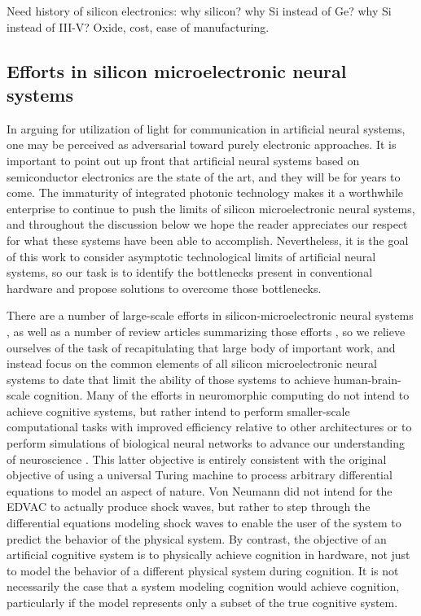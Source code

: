 \documentclass[twocolumn]{article}
\begin{document}
Need history of silicon electronics: why silicon? why Si instead of Ge? why Si instead of III-V? Oxide, cost, ease of manufacturing.

\subsection{Efforts in silicon microelectronic neural systems}
In arguing for utilization of light for communication in artificial neural systems, one may be perceived as adversarial toward purely electronic approaches. It is important to point out up front that artificial neural systems based on semiconductor electronics are the state of the art, and they will be for years to come. The immaturity of integrated photonic technology makes it a worthwhile enterprise to continue to push the limits of silicon microelectronic neural systems, and throughout the discussion below we hope the reader appreciates our respect for what these systems have been able to accomplish. Nevertheless, it is the goal of this work to consider asymptotic technological limits of artificial neural systems, so our task is to identify the bottlenecks present in conventional hardware and propose solutions to overcome those bottlenecks.

There are a number of large-scale efforts in silicon-microelectronic neural systems \cite{}, as well as a number of review articles summarizing those efforts \cite{}, so we relieve ourselves of the task of recapitulating that large body of important work, and instead focus on the common elements of all silicon microelectronic neural systems to date that limit the ability of those systems to achieve human-brain-scale cognition. Many of the efforts in neuromorphic computing do not intend to achieve cognitive systems, but rather intend to perform smaller-scale computational tasks with improved efficiency relative to other architectures \cite{mear2014,dasr2018} or to perform simulations of biological neural networks to advance our understanding of neuroscience \cite{pfgr2013,fuga2014}. This latter objective is entirely consistent with the original objective of using a universal Turing machine to process arbitrary differential equations to model an aspect of nature. Von Neumann did not intend for the EDVAC to actually produce shock waves, but rather to step through the differential equations modeling shock waves to enable the user of the system to predict the behavior of the physical system. By contrast, the objective of an artificial cognitive system is to physically achieve cognition in hardware, not just to model the behavior of a different physical system during cognition. It is not necessarily the case that a system modeling cognition would achieve cognition, particularly if the model represents only a subset of the true cognitive system.
\end{document}
